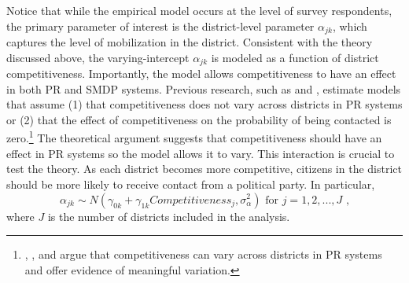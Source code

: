 \documentclass[12pt]{article}
\begin{document}
Notice that while the empirical model occurs at the level of survey respondents, the primary parameter of interest is the district-level parameter $\alpha_{jk}$, which captures the level of mobilization in the district. Consistent with the theory discussed above, the varying-intercept $\alpha_{jk}$ is modeled as a function of district competitiveness. Importantly, the model allows competitiveness to have an effect in both PR and SMDP systems. Previous research, such as \cite{Franklin2004} and \cite{KarpBanducciBowler2007}, estimate models that assume (1) that competitiveness does not vary across districts in PR systems or (2) that the effect of competitiveness on the probability of being contacted is zero.\footnote{\cite{GrofmanSelb2009}, \cite{Selb2009}, and \cite{BlaisLago2009} argue that competitiveness can vary across districts in PR systems and offer evidence of meaningful variation.} The theoretical argument suggests that competitiveness should have an effect in PR systems so the model allows it to vary. This interaction is crucial to test the theory. As each district becomes more competitive, citizens in the district should be more likely to receive contact from a political party. In particular, 
\begin{equation}
\alpha_{jk} \sim N(\gamma_{0k} + \gamma_{1k}Competitiveness_j, \sigma^2_{\alpha}) \text{ for } j = 1, 2,..., J \text{ ,}
\end{equation}
where $J$ is the number of districts included in the analysis.
\end{document}
